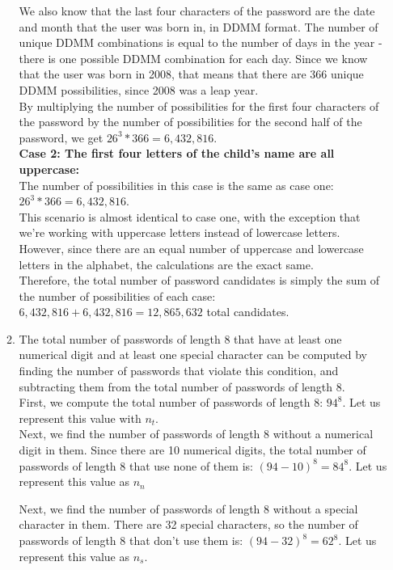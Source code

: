 \documentclass[11pt]{article}
\theoremstyle{definition}
\begin{document}
\begin{enumerate}
\begin{enumerate}
We also know that the last four characters of the password are the date and month that the user was born in, in DDMM format. The number
of unique DDMM combinations is equal to the number of days in the year - there is one possible DDMM combination for each day. Since we know
that the user was born in 2008, that means that there are 366 unique DDMM possibilities, since 2008 was a leap year.\\

By multiplying the number of possibilities for the first four characters of the password by the number of possibilities for the second half of the password,
we get $26^3 * 366 = 6,432,816 $.\\

\textbf{Case 2: The first four letters of the child's name are all uppercase:}\\
The number of possibilities in this case is the same as case one: $26^3 * 366 = 6,432,816$.\\
This scenario is almost identical to case one, with the exception that we're working with uppercase letters instead of lowercase letters. However, since there
are an equal number of uppercase and lowercase letters in the alphabet, the calculations are the exact same.\\

Therefore, the total number of password candidates is simply the sum of the number of possibilities of each case: $6,432,816 + 6,432,816 = 12,865,632$ total candidates.\\

\item The total number of passwords of length 8 that have at least one numerical digit and at least one special character can be computed by finding the number of passwords that
violate this condition, and subtracting them from the total number of passwords of length 8.\\ 

First, we compute the total number of passwords of length 8: $94^8$. Let us represent this value with $n_t$.\\

Next, we find the number of passwords of length 8 without a numerical digit in them. Since there are 10 numerical digits, the total number of passwords of length 8 that use none of them is:
$(94-10)^8 = 84^8$. Let us represent this value as $n_n$

Next, we find the number of passwords of length 8 without a special character in them. There are 32 special characters, so the number of passwords of length 8 
that don't use them is: $(94-32)^8 = 62^8$. Let us represent this value as $n_s$.\\


\end{enumerate}
\end{enumerate}
\end{document}
